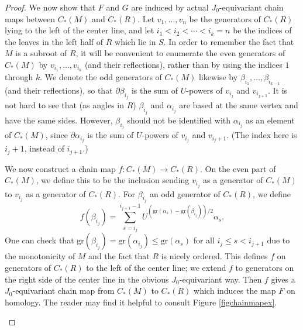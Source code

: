 \documentclass[11 pt]{amsart}
\theoremstyle{remark}
\def\gr{\mathrm{gr}}
\begin{document}
\begin{proof}
We now show that $F$ and $G$ are induced by actual $J_0$-equivariant chain maps between $C_*(M)$ and $C_*(R)$. Let $v_1, \ldots, v_n$ be the generators of $C_*(R)$ lying to the left of the center line, and let $i_1 < i_2 < \cdots < i_k = n$ be the indices of the leaves in the left half of $R$ which lie in $S$. In order to remember the fact that $M$ is a subroot of $R$, it will be convenient to enumerate the even generators of $C_*(M)$ by $v_{i_1}, \ldots, v_{i_k}$ (and their reflections), rather than by using the indices $1$ through $k$. We denote the odd generators of $C_*(M)$ likewise by $\beta_{i_1}, \ldots, \beta_{i_{k-1}}$ (and their reflections), so that $\partial \beta_{i_j}$ is the sum of $U$-powers of $v_{i_j}$ and $v_{i_{j+1}}$. It is not hard to see that (as angles in $R$) $\beta_{i_j}$ and $\alpha_{i_j}$ are based at the same vertex and have the same sides. However, $\beta_{i_j}$ should not be identified with $\alpha_{i_j}$ as an element of $C_*(M)$, since $\partial \alpha_{i_j}$ is the sum of $U$-powers of $v_{i_j}$ and $v_{i_j+1}$. (The index here is $i_j + 1$, instead of $i_{j+1}$.) 

We now construct a chain map $f: C_*(M) \rightarrow C_*(R)$. On the even part of $C_*(M)$, we define this to be the inclusion sending $v_{i_j}$ as a generator of $C_*(M)$ to $v_{i_j}$ as a generator of $C_*(R)$. For $\beta_{i_j}$ an odd generator of $C_*(R)$, we define
\[
f(\beta_{i_j}) = \sum_{s = i_j}^{i_{j+1}-1} U^{(\gr(\alpha_s)-\gr(\beta_{i_j}))/2} \alpha_s.
\]
One can check that $\gr(\beta_{i_j}) = \gr(\alpha_{i_j}) \leq \gr(\alpha_s)$ for all $i_j \leq s < i_{j+1}$ due to the monotonicity of $M$ and the fact that $R$ is nicely ordered. This defines $f$ on generators of $C_*(R)$ to the left of the center line; we extend $f$ to generators on the right side of the center line in the obvious $J_0$-equivariant way. Then $f$ gives a $J_0$-equivariant chain map from $C_*(M)$ to $C_*(R)$ which induces the map $F$ on homology. The reader may find it helpful to consult Figure \ref{figchainmapex}. 


\begin{figure}[h!]
\end{figure}
\end{proof}
\end{document}
